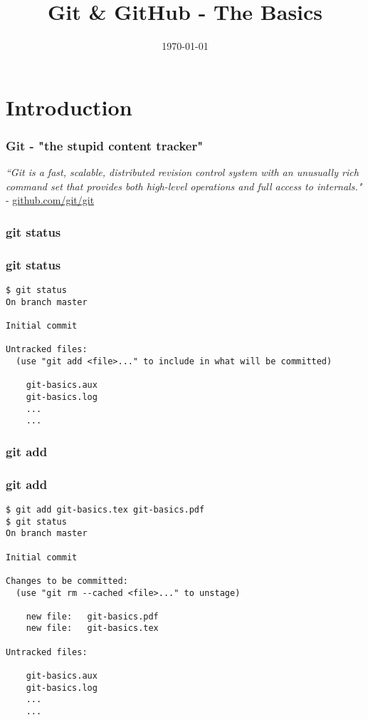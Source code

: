 \documentclass{beamer}
\title[Git]{Git \& GitHub - The Basics} %
\author{} %
\institute[] %
{
 \\ %
\medskip
\textit{chris@cjwfuller.com}
}
\date{\today}
\begin{document}
\begin{frame}
\titlepage
\end{frame}

\section{Introduction}

\begin{frame}
\frametitle{Git - "the stupid content tracker"}
\textit{``Git is a fast, scalable, distributed revision control system with an unusually rich command set that provides both high-level operations and full access to internals."} - \url{github.com/git/git}
\end{frame}


\begin{frame}
\frametitle{git status}

\end{frame}


\begin{frame}[fragile]
\frametitle{git status}
	\scriptsize
	\begin{verbatim}
$ git status
On branch master

Initial commit

Untracked files:
  (use "git add <file>..." to include in what will be committed)

	git-basics.aux
	git-basics.log
	...
	...
	\end{verbatim}
\end{frame}



\begin{frame}
\frametitle{git add}

\end{frame}


\begin{frame}[fragile]
\frametitle{git add}
	\scriptsize
	\begin{verbatim}
$ git add git-basics.tex git-basics.pdf
$ git status
On branch master

Initial commit

Changes to be committed:
  (use "git rm --cached <file>..." to unstage)

	new file:   git-basics.pdf
	new file:   git-basics.tex

Untracked files:

	git-basics.aux
	git-basics.log
	...
	...
	\end{verbatim}
\end{frame}
\end{document}

